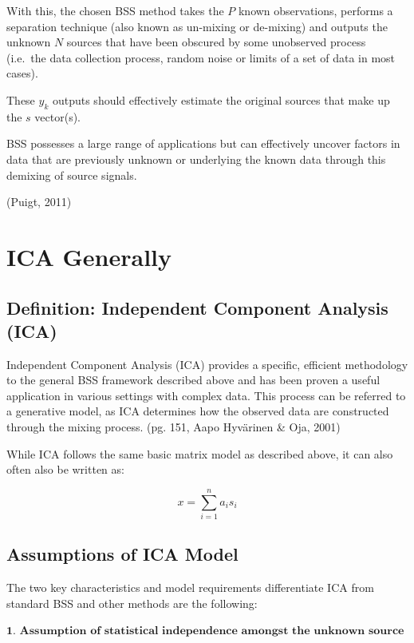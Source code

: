 \documentclass[12pt,twoside]{amherstthesis}
\begin{document}
  With this, the chosen BSS method takes the \(P\) known observations,
  performs a separation technique (also known as un-mixing or de-mixing)
  and outputs the unknown \(N\) sources that have been obscured by some
  unobserved process (i.e.~the data collection process, random noise or
  limits of a set of data in most cases).
  
  These \(y_k\) outputs should effectively estimate the original sources
  that make up the \(s\) vector(s).
  
  BSS possesses a large range of applications but can effectively uncover
  factors in data that are previously unknown or underlying the known data
  through this demixing of source signals.
  
  (Puigt, 2011)
  
  \section{ICA Generally}\label{ica-generally}
  
  \subsection{Definition: Independent Component Analysis
  (ICA)}\label{definition-independent-component-analysis-ica}
  
  Independent Component Analysis (ICA) provides a specific, efficient
  methodology to the general BSS framework described above and has been
  proven a useful application in various settings with complex data. This
  process can be referred to a generative model, as ICA determines how the
  observed data are constructed through the mixing process. (pg. 151, Aapo
  Hyvärinen \& Oja, 2001)
  
  While ICA follows the same basic matrix model as described above, it can
  also often also be written as:
  
  \[x = \sum_{i=1}^n a_is_i\]
  
  \subsection{Assumptions of ICA Model}\label{assumptions-of-ica-model}
  
  The two key characteristics and model requirements differentiate ICA
  from standard BSS and other methods are the following: \newline
  
  \(\textbf{1. Assumption of statistical independence amongst the unknown source components}\)
  
\end{document}
